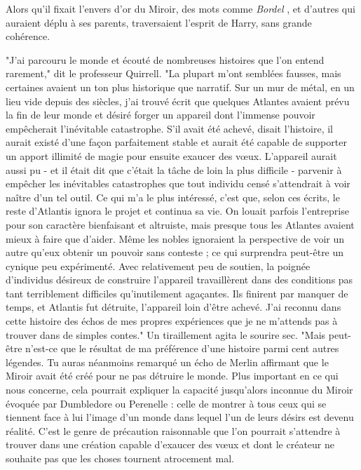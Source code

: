 Alors qu'il fixait l'envers d'or du Miroir, des mots comme \emph{Bordel} , et d'autres qui auraient déplu à ses parents, traversaient l'esprit de Harry, sans grande cohérence.

"J'ai parcouru le monde et écouté de nombreuses histoires que l'on entend rarement," dit le professeur Quirrell. "La plupart m'ont semblées fausses, mais certaines avaient un ton plus historique que narratif. Sur un mur de métal, en un lieu vide depuis des siècles, j'ai trouvé écrit que quelques Atlantes avaient prévu la fin de leur monde et désiré forger un appareil dont l'immense pouvoir empêcherait l'inévitable catastrophe. S'il avait été achevé, disait l'histoire, il aurait existé d'une façon parfaitement stable et aurait été capable de supporter un apport illimité de magie pour ensuite exaucer des vœux. L'appareil aurait aussi pu - et il était dit que c'était la tâche de loin la plus difficile - parvenir à empêcher les inévitables catastrophes que tout individu censé s'attendrait à voir naître d'un tel outil. Ce qui m'a le plus intéressé, c'est que, selon ces écrits, le reste d'Atlantis ignora le projet et continua sa vie. On louait parfois l'entreprise pour son caractère bienfaisant et altruiste, mais presque tous les Atlantes avaient mieux à faire que d'aider. Même les nobles ignoraient la perspective de voir un autre qu'eux obtenir un pouvoir sans conteste ; ce qui surprendra peut-être un cynique peu expérimenté. Avec relativement peu de soutien, la poignée d'individus désireux de construire l'appareil travaillèrent dans des conditions pas tant terriblement difficiles qu'inutilement agaçantes. Ils finirent par manquer de temps, et Atlantis fut détruite, l'appareil loin d'être achevé. J'ai reconnu dans cette histoire des échos de mes propres expériences que je ne m'attends pas à trouver dans de simples contes." Un tiraillement agita le sourire sec. "Mais peut-être n'est-ce que le résultat de ma préférence d'une histoire parmi cent autres légendes. Tu auras néanmoins remarqué un écho de Merlin affirmant que le Miroir avait été créé pour ne pas détruire le monde. Plus important en ce qui nous concerne, cela pourrait expliquer la capacité jusqu'alors inconnue du Miroir évoquée par Dumbledore ou Perenelle : celle de montrer à tous ceux qui se tiennent face à lui l'image d'un monde dans lequel l'un de leurs désirs est devenu réalité. C'est le genre de précaution raisonnable que l'on pourrait s'attendre à trouver dans une création capable d'exaucer des vœux et dont le créateur ne souhaite pas que les choses tournent atrocement mal.

